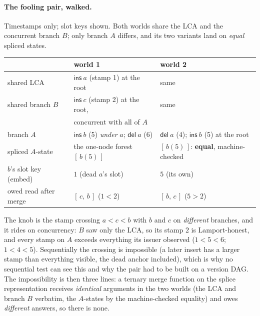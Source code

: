 \documentclass[11pt]{article}
\newcommand{\del}{\mathsf{del}}
\newcommand{\ins}{\mathsf{ins}}
\begin{document}
\paragraph{The fooling pair, walked.} Timestamps only; slot keys
shown. Both worlds share the LCA and the concurrent branch $B$; only
branch $A$ differs, and its two variants land on \emph{equal} spliced
states.

\begin{center}\small
\begin{tabular}{@{}lll@{}}
\toprule
 & world 1 & world 2 \\
\midrule
shared LCA & $\ins\ a$ (stamp 1) at the root & same \\
shared branch $B$ & $\ins\ c$ (stamp 2) at the root, & same \\
 & concurrent with all of $A$ & \\
branch $A$ & $\ins\ b$ (5) \emph{under} $a$; $\del\ a$ (6) &
  $\del\ a$ (4); $\ins\ b$ (5) at the root \\
spliced $A$-state & the one-node forest $[\,b(5)\,]$ &
  $[\,b(5)\,]$: \textbf{equal}, machine-checked \\
$b$'s slot key (embed) & $1$ (dead $a$'s slot) & $5$ (its own) \\
owed read after merge & $[\,c,\, b\,]$ ($1 < 2$) &
  $[\,b,\, c\,]$ ($5 > 2$) \\
\bottomrule
\end{tabular}
\end{center}

\noindent The knob is the stamp crossing $a < c < b$ with $b$ and $c$
on \emph{different} branches, and it rides on concurrency: $B$ saw only
the LCA, so its stamp $2$ is Lamport-honest, and every stamp on $A$
exceeds everything its issuer observed ($1 < 5 < 6$; $1 < 4 < 5$).
Sequentially the crossing is impossible (a later insert has a larger
stamp than everything visible, the dead anchor included), which is why
no sequential test can see this and why the pair had to be built on a
version DAG. The impossibility is then three lines: a ternary merge
function on the splice representation receives \emph{identical}
arguments in the two worlds (the LCA and branch $B$ verbatim, the
$A$-states by the machine-checked equality) and owes \emph{different}
answers, so there is none.
\end{document}
